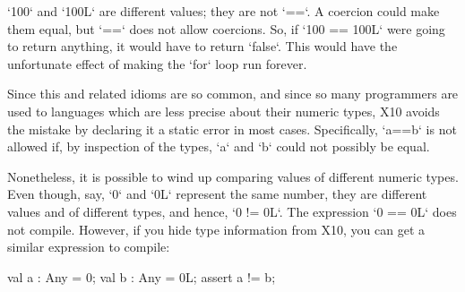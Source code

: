 \xcd`100` and \xcd`100L` are different values; they are not \xcd`==`. A
coercion could make them equal, but \xcd`==` does not allow coercions. So, if
\xcd`100 == 100L` were going to return anything, it would have to return
\xcd`false`. This would have the unfortunate effect of making the \xcd`for`
loop run forever.

Since this and related idioms are so common, and since so many programmers are
used to languages which are less precise about their numeric types, X10 avoids
the mistake by declaring it a static error in most cases.  Specifically,
\xcd`a==b` is not allowed if, by inspection of the types, \xcd`a` and \xcd`b`
could not possibly be equal.

\begin{ex}
Nonetheless, it is possible to wind up comparing values of different numeric
types.   Even though, say, \xcd`0` and \xcd`0L` represent the same number,
they are different values and of different types, and hence, \xcd`0 != 0L`.  
The expression \xcd`0 == 0L` does not compile.  However, if you hide type
information from X10, you can get a similar expression to compile: 

\begin{xten}
   val a : Any = 0;
   val b : Any = 0L;
   assert a != b;
\end{xten}


\end{ex}


